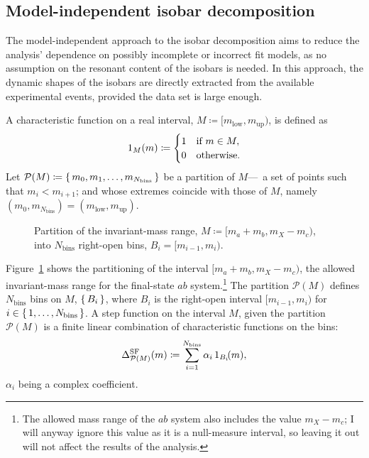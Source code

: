 \subsection{Model-independent isobar decomposition}
\label{sec:model_independent_isobar_decomposition}

    The model-independent approach to the isobar decomposition aims to reduce the analysis' dependence on possibly incomplete or incorrect fit models, as no assumption on the resonant content of the isobars is needed.
    In this approach, the dynamic shapes of the isobars are directly extracted from the available experimental events, provided the data set is large enough.
    

    A characteristic function on a real interval, $M \coloneqq [m_{\text{low}}, m_{\text{up}})$, is defined as
    \begin{equation}
        1_M(m) \coloneqq 
        \begin{cases}
            1 &\text{if }m \in M, \\
            0 &\text{otherwise}.
        \end{cases}
    \end{equation}
    Let $\mathcal{P}(M) \coloneqq \set{m_0, m_1,\dots, m_{N_\text{bins}}}$ be a partition of $M$---\ie~a set of points such that $m_{i} < m_{i+1}$; and whose extremes coincide with those of $M$, namely $(m_0, m_{N_\text{bins}}) = (m_{\text{low}}, m_{\text{up}})$.
    \begin{figure}
        \centering
        
        \caption[Partition of the invariant-mass range into $N_\text{bins}$ right-open bins.]%
        {Partition of the invariant-mass range, $M \coloneqq [m_a+m_b,m_X - m_c)$, into $N_\text{bins}$ right-open bins, $B_i = [m_{i-1}, m_i)$.}
        \label{fig:invariant-mass-partition}
    \end{figure}
    Figure~\ref{fig:invariant-mass-partition} shows the partitioning of the interval $[m_a+m_b,m_X-m_c)$, the allowed invariant-mass range for the final-state $ab$ system.\footnote{The allowed mass range of the $ab$ system also includes the value $m_X - m_c$; I will anyway ignore this value as it is a null-measure interval, so leaving it out will not affect the results of the analysis.}
    The partition $\mathcal{P}(M)$ defines $N_\text{bins}$ bins on $M$, $\set{B_i}$, where $B_i$ is the right-open interval $[m_{i-1},m_i)$ for $i\in\set{1,\dots, N_\text{bins}}$.
    A step function on the interval $M$, given the partition $\mathcal{P}(M)$ is a finite linear combination of characteristic functions on the bins:
    \begin{equation}\label{eq:step_dynamic_shape}
        \Delta_{\mathcal{P}(M)}^{\text{SF}}(m) \coloneqq \sum_{i = 1}^{N_\text{bins}} \alpha_i\, 1_{B_i}\!(m),
    \end{equation}
    $\alpha_i$ being a complex coefficient.


